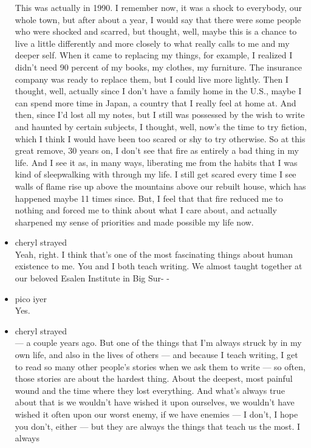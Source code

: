 \begin{itemize}
  This was actually in 1990. I remember now, it was a shock to
  everybody, our whole town, but after about a year, I would say that
  there were some people who were shocked and scarred, but thought,
  well, maybe this is a chance to live a little differently and more
  closely to what really calls to me and my deeper self. When it came to
  replacing my things, for example, I realized I didn't need 90 percent
  of my books, my clothes, my furniture. The insurance company was ready
  to replace them, but I could live more lightly. Then I thought, well,
  actually since I don't have a family home in the U.S., maybe I can
  spend more time in Japan, a country that I really feel at home at. And
  then, since I'd lost all my notes, but I still was possessed by the
  wish to write and haunted by certain subjects, I thought, well, now's
  the time to try fiction, which I think I would have been too scared or
  shy to try otherwise. So at this great remove, 30 years on, I don't
  see that fire as entirely a bad thing in my life. And I see it as, in
  many ways, liberating me from the habits that I was kind of
  sleepwalking with through my life. I still get scared every time I see
  walls of flame rise up above the mountains above our rebuilt house,
  which has happened maybe 11 times since. But, I feel that that fire
  reduced me to nothing and forced me to think about what I care about,
  and actually sharpened my sense of priorities and made possible my
  life now.
\item
  cheryl strayed\\
  Yeah, right. I think that's one of the most fascinating things about
  human existence to me. You and I both teach writing. We almost taught
  together at our beloved Esalen Institute in Big Sur- -
\item
  pico iyer\\
  Yes.
\item
  cheryl strayed\\
  --- a couple years ago. But one of the things that I'm always struck
  by in my own life, and also in the lives of others --- and because I
  teach writing, I get to read so many other people's stories when we
  ask them to write --- so often, those stories are about the hardest
  thing. About the deepest, most painful wound and the time where they
  lost everything. And what's always true about that is we wouldn't have
  wished it upon ourselves, we wouldn't have wished it often upon our
  worst enemy, if we have enemies --- I don't, I hope you don't, either
  --- but they are always the things that teach us the most. I always

\end{itemize}
